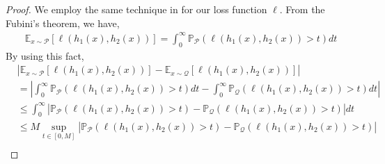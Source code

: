\begin{proof}
We employ the same technique in \citet{zhao2018multi_domain_adapt} for our loss function $\ell$.
From the Fubini's theorem, we have,
\begin{align}
    \mathbb{E}_{x\sim\mathcal{P}}[\ell(h_{1}(x),h_{2}(x))] = \int_{0}^{\infty} \mathbb{P}_{\mathcal{P}}\left(\ell(h_{1}(x),h_{2}(x)) > t\right) dt
\end{align}
By using this fact, 
\begin{align}
    &\left|\mathbb{E}_{x\sim\mathcal{P}}[\ell(h_{1}(x),h_{2}(x))]- \mathbb{E}_{x\sim\mathcal{Q}}[\ell(h_{1}(x),h_{2}(x))]\right|\\
    &= \left|\int_{0}^{\infty} \mathbb{P}_{\mathcal{P}}\left(\ell(h_{1}(x),h_{2}(x)) > t\right) dt - \int_{0}^{\infty} \mathbb{P}_{\mathcal{Q}}\left(\ell(h_{1}(x),h_{2}(x)) > t\right) dt\right|\\
    &\leq \int_{0}^{\infty} \left|\mathbb{P}_{\mathcal{P}}\left(\ell(h_{1}(x),h_{2}(x)) > t\right) -  \mathbb{P}_{\mathcal{Q}}\left(\ell(h_{1}(x),h_{2}(x)) > t\right) \right|dt\\
    &\leq M\sup_{t\in[0,M]} \left|\mathbb{P}_{\mathcal{P}}\left(\ell(h_{1}(x),h_{2}(x)) > t\right) -  \mathbb{P}_{\mathcal{Q}}\left(\ell(h_{1}(x),h_{2}(x)) > t\right) \right|\\

\end{align}
\end{proof}
